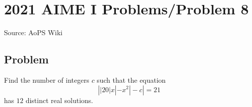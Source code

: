\documentclass[12pt]{article}
\begin{document}
\section*{{2021 AIME I Problems/Problem 8}}
Source: AoPS Wiki

\subsection*{Problem}
Find the number of integers $c$ such that the equation \[\left||20|x|-x^2|-c\right|=21\] has $12$ distinct real solutions.
\end{document}
